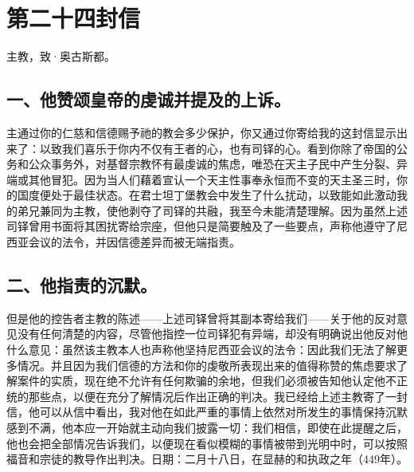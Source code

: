 

\section{第二十四封信}

主教，致·奥古斯都。\par


\subsection{一、他赞颂皇帝的虔诚并提及的上诉。}

主通过你的仁慈和信德赐予祂的教会多少保护，你又通过你寄给我的这封信显示出来了：以致我们喜乐于你内不仅有王者的心，也有司铎的心。看到你除了帝国的公务和公众事务外，对基督宗教怀有最虔诚的焦虑，唯恐在天主子民中产生分裂、异端或其他冒犯。因为当人们藉着宣认一个天主性事奉永恒而不变的天主圣三时，你的国度便处于最佳状态。在君士坦丁堡教会中发生了什么扰动，以致能如此激动我的弟兄兼同为主教，使他剥夺了司铎的共融，我至今未能清楚理解。因为虽然上述司铎曾用书面将其困扰寄给宗座，但他只是简要触及了一些要点，声称他遵守了尼西亚会议的法令，并因信德差异而被无端指责。\par


\subsection{二、他指责的沉默。}

但是他的控告者主教的陈述——上述司铎曾将其副本寄给我们——关于他的反对意见没有任何清楚的内容，尽管他指控一位司铎犯有异端，却没有明确说出他反对他什么意见：虽然该主教本人也声称他坚持尼西亚会议的法令：因此我们无法了解更多情况。并且因为我们信德的方法和你的虔敬所表现出来的值得称赞的焦虑要求了解案件的实质，现在绝不允许有任何欺骗的余地，但我们必须被告知他认定他不正统的那些点，以便在充分了解情况后作出正确的判决。我已经给上述主教寄了一封信，他可以从信中看出，我对他在如此严重的事情上依然对所发生的事情保持沉默感到不满，他本应一开始就主动向我们披露一切：我们相信，即使在此提醒之后，他也会把全部情况告诉我们，以便现在看似模糊的事情被带到光明中时，可以按照福音和宗徒的教导作出判决。日期：二月十八日，在显赫的和执政之年（449年）。\par

